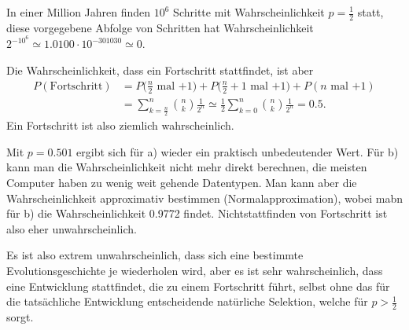 \begin{loesung}
\begin{teilaufgaben}
\item
In einer Million Jahren finden $10^6$ Schritte mit Wahrscheinlichkeit
$p=\frac12$ statt, diese vorgegebene Abfolge von Schritten hat
Wahrscheinlichkeit $2^{-10^{6}}\simeq 1.0100\cdot 10^{-301030}\simeq 0$.
\item
Die Wahrscheinlichkeit, dass ein Fortschritt stattfindet, ist aber
\begin{align*}
P(\text{Fortschritt})
&=
P\biggl(\text{$\frac{n}2$ mal $+1$}\biggr)
+
P\biggl(\text{$\frac{n}2+1$ mal $+1$}\biggr)
+
P(\text{$n$ mal $+1$})
\\
&=
\sum_{k=\frac{n}2}^n\binom{n}{k}\frac1{2^n}
\simeq
\frac12
\sum_{k=0}^n\binom{n}{k}\frac1{2^n}
= 0.5.
\end{align*}
Ein Fortschritt ist also ziemlich wahrscheinlich.
\end{teilaufgaben}
Mit $p=0.501$ ergibt sich für a) wieder ein praktisch unbedeutender
Wert. Für b) kann man die Wahrscheinlichkeit nicht mehr direkt
berechnen, die meisten Computer haben zu wenig weit gehende
Datentypen. Man kann aber die Wahrscheinlichkeit approximativ
bestimmen (Normalapproximation), wobei mabn für b) die Wahrscheinlichkeit
0.9772 findet. Nichtstattfinden von Fortschritt ist also eher unwahrscheinlich.

Es ist also extrem unwahrscheinlich, dass sich eine bestimmte
Evolutionsgeschichte je wiederholen wird, aber es ist sehr wahrscheinlich,
dass eine Entwicklung stattfindet, die zu einem Fortschritt führt,
selbst ohne das für die tatsächliche Entwicklung entscheidende
natürliche Selektion, welche für $p>\frac12$ sorgt.
\end{loesung}

